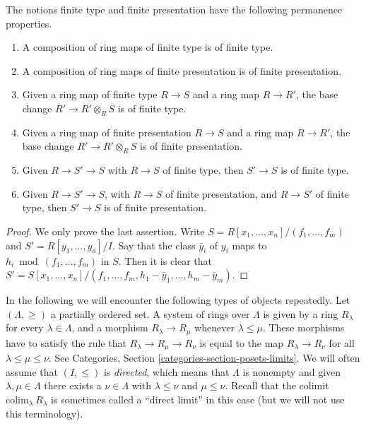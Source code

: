 \begin{lemma}
\label{lemma-compose-finite-type}
The notions finite type and finite presentation have the following
permanence properties.
\begin{enumerate}
\item A composition of ring maps of finite type is of finite type.
\item A composition of ring maps of finite presentation is of finite
presentation.
\item Given a ring map of finite type $R \to S$ and a ring map $R \to R'$,
the base change $R' \to R' \otimes_R S$ is of finite type.
\item Given a ring map of finite presentation $R \to S$
and a ring map $R \to R'$, the base change $R' \to R' \otimes_R S$
is of finite presentation.
\item Given $R \to S' \to S$ with $R \to S$ of finite type,
then $S' \to S$ is of finite type.
\item Given $R \to S' \to S$, with $R \to S$ of finite presentation,
and $R \to S'$ of finite type, then $S' \to S$ is of finite presentation.
\end{enumerate}
\end{lemma}

\begin{proof}
We only prove the last assertion.
Write $S = R[x_1, \ldots, x_n]/(f_1, \ldots, f_m)$
and $S' = R[y_1, \ldots, y_a]/I$. Say that the class
$\bar y_i$ of $y_i$ maps
to $h_i \bmod (f_1, \ldots, f_m)$ in $S$.
Then it is clear that
$S' = S[x_1, \ldots, x_n]/(f_1, \ldots, f_m,
h_1 - \bar y_1, \ldots, h_m - \bar y_m)$.
\end{proof}

\noindent
In the following we will encounter the following types of
objects repeatedly. Let $(\Lambda, \geq)$ a partially
ordered set. A system of rings over $\Lambda$ is given by
a ring $R_\lambda$ for every $\lambda \in \Lambda$,
and a morphism $R_\lambda \to R_\mu$ whenever $\lambda \leq \mu$.
These morphisms have to satisfy the rule that
$R_\lambda \to R_\mu \to R_\nu$ is equal to the map
$R_\lambda \to R_\nu$ for all $\lambda \leq \mu \leq \nu$.
See Categories, Section \ref{categories-section-posets-limits}.
We will often assume that $(I, \leq)$ is {\it directed},
which means that $\Lambda$ is nonempty and
given $\lambda, \mu \in \Lambda$
there exists a $\nu \in \Lambda$ with $\lambda \leq \nu$ and $\mu \leq \nu$.
Recall that the colimit $\text{colim}_\lambda\ R_\lambda$
is sometimes called a ``direct limit'' in this case
(but we will not use this terminology).

